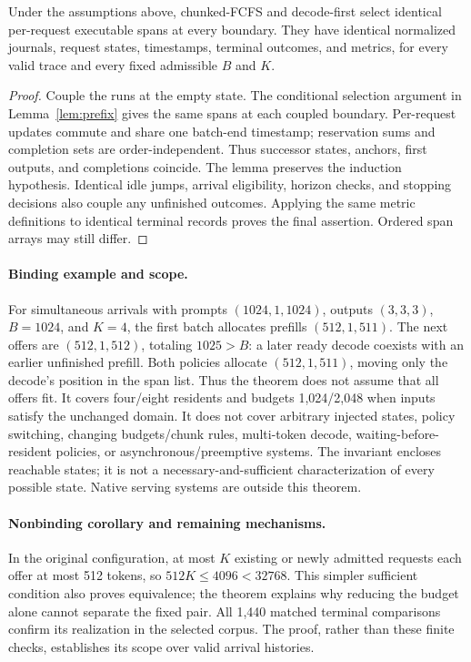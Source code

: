 \begin{theorem}\label{thm:equivalence}
Under the assumptions above, chunked-FCFS and decode-first select identical
per-request executable spans at every boundary. They have identical
normalized journals, request states, timestamps, terminal outcomes, and
metrics, for every valid trace and every fixed admissible $B$ and $K$.
\end{theorem}
\begin{proof}
Couple the runs at the empty state. The conditional selection argument in
Lemma~\ref{lem:prefix} gives the same spans at each coupled boundary.
Per-request updates commute and share one batch-end timestamp; reservation
sums and completion sets are order-independent. Thus successor states,
anchors, first outputs, and completions coincide. The lemma preserves the
induction hypothesis. Identical idle jumps, arrival eligibility, horizon
checks, and stopping decisions also couple any unfinished outcomes.
Applying the same metric definitions to identical terminal records proves
the final assertion. Ordered span arrays may still differ.
\end{proof}

\paragraph{Binding example and scope.}
For simultaneous arrivals with prompts $(1024,1,1024)$, outputs $(3,3,3)$,
$B=1024$, and $K=4$, the first batch allocates prefills $(512,1,511)$.
The next offers are $(512,1,512)$, totaling $1025>B$: a later ready decode
coexists with an earlier unfinished prefill. Both policies allocate
$(512,1,511)$, moving only the decode's position in the span list.
Thus the theorem does not assume that all offers fit. It covers four/eight
residents and budgets 1,024/2,048 when inputs satisfy the unchanged domain.
It does not cover arbitrary injected states, policy switching, changing
budgets/chunk rules, multi-token decode, waiting-before-resident policies,
or asynchronous/preemptive systems. The invariant encloses reachable states;
it is not a necessary-and-sufficient characterization of every possible
state. Native serving systems are outside this theorem.

\paragraph{Nonbinding corollary and remaining mechanisms.}
In the original configuration, at most $K$ existing or newly admitted
requests each offer at most 512 tokens, so $512K\leq4096<32768$.
This simpler sufficient condition also proves equivalence; the theorem
explains why reducing the budget alone cannot separate the fixed pair.
All 1,440 matched terminal comparisons confirm its realization in the
selected corpus. The proof, rather than these finite checks, establishes
its scope over valid arrival histories.

